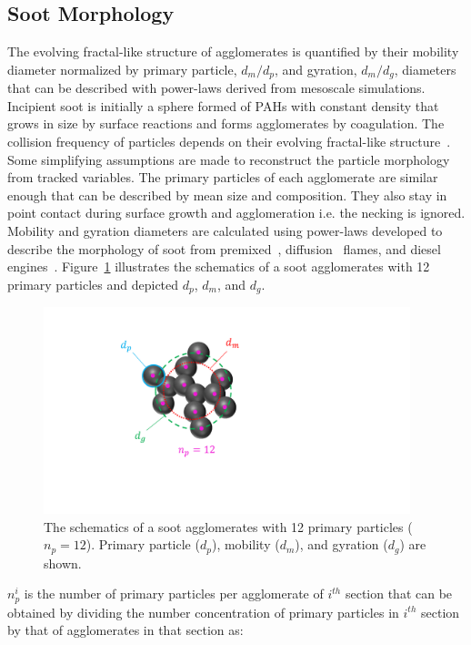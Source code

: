 \subsection{Soot Morphology}
\label{sec:sootmorphology}
The evolving fractal-like structure of agglomerates is quantified by their mobility diameter normalized by primary particle, $d_m/d_p$, and gyration, $d_m/d_g$, diameters that can be described with power-laws derived from mesoscale simulations.
Incipient soot is initially a sphere formed of PAHs with constant density that grows in size by surface reactions and forms agglomerates by coagulation. The collision frequency of particles depends on their evolving fractal-like structure~\citep{mulholland1988cluster}. Some simplifying assumptions are made to reconstruct the particle morphology from tracked variables. The primary particles of each agglomerate are similar enough that can be described by mean size and composition. They also stay in point contact during surface growth and agglomeration i.e. the necking is ignored.
Mobility and gyration diameters are calculated using power-laws developed to describe the morphology of soot from premixed~\citep{abid2008evolution}, diffusion~\citep{yon2015simple} flames, and diesel engines~\citep{rissler2013effective}. Figure~\ref{fig:Morphology} illustrates the schematics of a soot agglomerates with 12 primary particles and depicted ${d_p}$, ${d_m}$, and ${d_g}$.  
\begin{figure}[!htbp]
	\centering
	\includegraphics[height=60mm, ]{Figures/Morphology.pdf}
	\caption{The schematics of a soot agglomerates with 12 primary particles (${n_p=12}$). Primary particle (${d_p}$), mobility (${d_m}$), and gyration (${d_g}$) are shown.}
	\label{fig:Morphology}
\end{figure} 

${n^i_p}$ is the number of primary particles per agglomerate of ${i^{th}}$ section that can be obtained by dividing the number concentration of primary particles in ${i^{th}}$ section by that of agglomerates in that section as:

